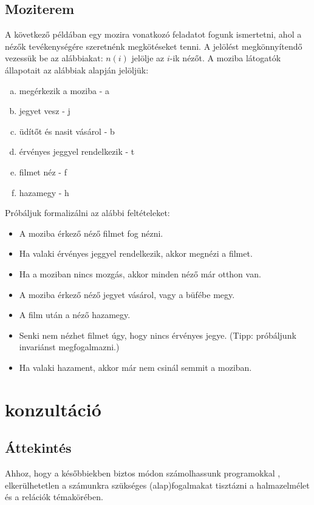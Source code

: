 \documentclass[12pt]{article}
\begin{document}
	\subsection{Moziterem}\label{moziterem-feladat}
	A következő példában egy mozira vonatkozó feladatot fogunk ismertetni, ahol a nézők tevékenységére szeretnénk megkötéseket tenni. A jelölést megkönnyítendő vezessük be az alábbiakat: $n(i)$ jelölje az $i$-ik nézőt. A moziba látogatók állapotait az alábbiak alapján jelöljük:
	\begin{enumerate}[a)]
		\item megérkezik a moziba - a
		\item jegyet vesz - j
		\item üdítőt és nasit vásárol - b
		\item érvényes jeggyel rendelkezik - t
		\item filmet néz - f
		\item hazamegy - h
	\end{enumerate}
	Próbáljuk formalizálni az alábbi feltételeket:
	\begin{itemize}
		\item A moziba érkező néző filmet fog nézni.
		\item Ha valaki érvényes jeggyel rendelkezik, akkor megnézi a filmet.
		\item Ha a moziban nincs mozgás, akkor minden néző már otthon van.
		\item A moziba érkező néző jegyet vásárol, vagy a büfébe megy.
		\item A film után a néző hazamegy.
		\item Senki nem nézhet filmet úgy, hogy nincs érvényes jegye. (Tipp: próbáljunk invariánst megfogalmazni.)
		\item Ha valaki hazament, akkor már nem csinál semmit a moziban.
	\end{itemize}
	
	\newpage
	\section{konzultáció}
	\subsection{Áttekintés}
	Ahhoz, hogy a későbbiekben biztos módon számolhassunk programokkal , elkerülhetetlen a számunkra szükséges (alap)fogalmakat tisztázni a halmazelmélet és a relációk témakörében.
	
\end{document}
